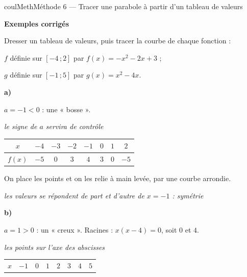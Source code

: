 \documentclass[11pt,a4paper]{article}
\makeatletter
\newcommand{\lycee@repere}[4]{%
  \draw[grille,step=1] (#1,#2) grid (#3,#4);
  \draw[-{Stealth[length=2mm]},thick] (#1,0)--({#3+0.4},0) node[below left=-1pt]{$x$};
  \draw[-{Stealth[length=2mm]},thick] (0,#2)--(0,{#4+0.4}) node[below left=-1pt]{$y$};
  \node[below left,font=\scriptsize,inner sep=1.5pt] at (0,0) {$0$};}
\newcommand{\lycee@gradx}[1]{\foreach \k/\l in {#1}{%
  \draw (\k,0.07)--(\k,-0.07) node[below,font=\scriptsize,inner sep=1.5pt]{$\l$};}}
\newcommand{\lycee@grady}[1]{\foreach \k/\l in {#1}{%
  \draw (0.07,\k)--(-0.07,\k) node[left,font=\scriptsize,inner sep=1.5pt]{$\l$};}}
\newcommand{\lycee@intff}[2]{\left[#1\,;#2\right]}
\providecommand{\repere}{\lycee@repere}%
\providecommand{\gradx}{\lycee@gradx}%
\providecommand{\grady}{\lycee@grady}%
\providecommand{\intff}{\lycee@intff}%
\newcounter{lycee@signet}
\newcommand{\signet}[3][]{\stepcounter{lycee@signet}%
  \edef\lycee@dest{\if\relax\detokenize{#1}\relax
    signet.\arabic{lycee@signet}\else#1\fi}%
  \hypertarget{\lycee@dest}{}\bookmark[level=#2,dest=\lycee@dest]{#3}}
\newcounter{methode}
\newenvironment{methodebox}[1][Méthode]{\stepcounter{methode}%
  \begin{boitecours}[phantom={\signet[methode-\arabic{methode}]{2}{#1}}]{coulMeth}{#1}}%
  {\end{boitecours}}
\newcommand{\etape}[1]{\par\smallskip\textbf{\color{coulMeth}#1}\par\nobreak\smallskip}
\newcommand{\explique}[2]{\par\smallskip\noindent
  \begin{minipage}[t]{0.57\linewidth}\raggedright #1\end{minipage}\hfill
  \begin{minipage}[t]{0.40\linewidth}\raggedright\leavevmode
    {\small\itshape\color{black!60}#2}\end{minipage}\par}
\newcommand{\cas}[1]{\par\smallskip\noindent\textbf{\color{coulExo}#1}\vadjust{\nobreak}}
\newenvironment{correction}{\par}{\par}
\newcommand{\etapeexemples}{\etape{Exemples corrigés}}
\makeatother
\begin{document}
\begin{methodebox}[Méthode 6 --- Tracer une parabole à partir d'un tableau de valeurs]
\etapeexemples
Dresser un tableau de valeurs, puis tracer la courbe de chaque fonction :
\begin{questions}[label=\alph*)]
  \item $f$ définie sur $\intff{-4}{2}$ par $f(x)=-x^{2}-2x+3$ ;
  \item $g$ définie sur $\intff{-1}{5}$ par $g(x)=x^{2}-4x$.
\end{questions}
\begin{correction}
\cas{a)}\par\nopagebreak
\begin{minipage}[c]{0.58\linewidth}\raggedright
\explique{$a=-1<0$ : une « bosse ».}{le signe de $a$ servira de contrôle}
\begin{center}\small
\renewcommand{\arraystretch}{1.25}
\begin{tabular}{|c|c|c|c|c|c|c|c|}
\hline
$x$ & $-4$ & $-3$ & $-2$ & $-1$ & $0$ & $1$ & $2$\\
\hline
$f(x)$ & $-5$ & $0$ & $3$ & $4$ & $3$ & $0$ & $-5$\\
\hline
\end{tabular}
\end{center}
\explique{On place les points et on les relie à main levée, par une courbe arrondie.}{%
les valeurs se répondent de part et d'autre de $x=-1$ : symétrie}
\end{minipage}\hfill
\begin{minipage}[c]{0.38\linewidth}\centering
{}
\end{minipage}
\cas{b)}\par\nopagebreak
\begin{minipage}[c]{0.58\linewidth}\raggedright
\explique{$a=1>0$ : un « creux ». Racines : $x(x-4)=0$, soit $0$ et $4$.}{les points sur
l'axe des abscisses}
\begin{center}\small
\renewcommand{\arraystretch}{1.25}
\begin{tabular}{|c|c|c|c|c|c|c|c|}
\hline
$x$ & $-1$ & $0$ & $1$ & $2$ & $3$ & $4$ & $5$\\

\end{tabular}
\end{center}
\end{minipage}
\end{correction}
\end{methodebox}
\end{document}
